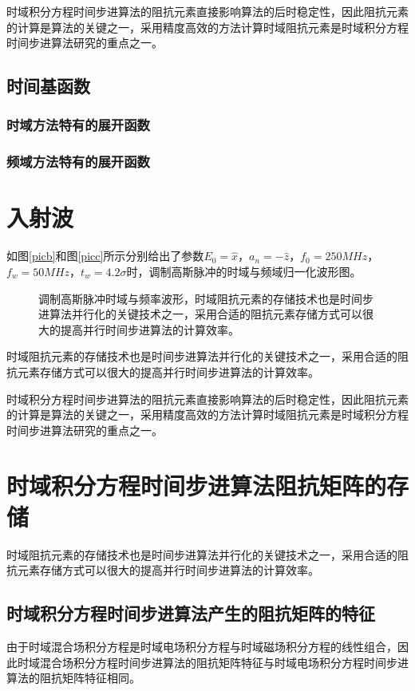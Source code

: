\documentclass{standalone}
\begin{document}
时域积分方程时间步进算法的阻抗元素直接影响算法的后时稳定性，因此阻抗元素的计算是算法的关键之一，采用精度高效的方法计算时域阻抗元素是时域积分方程时间步进算法研究的重点之一。


\subsection{时间基函数}

\subsubsection{时域方法特有的展开函数}

\subsubsection{频域方法特有的展开函数}

\section{入射波}

如图\ref{picb}和图\ref{picc}所示分别给出了参数$E_0=\hat{x}$，$a_n=-\hat{z}$，$f_0=250MHz$，$f_w=50MHz$，$t_w=4.2\sigma$时，调制高斯脉冲的时域与频域归一化波形图。

\begin{figure}[h]
	\caption{调制高斯脉冲时域与频率波形，时域阻抗元素的存储技术也是时间步进算法并行化的关键技术之一，采用合适的阻抗元素存储方式可以很大的提高并行时间步进算法的计算效率。}
	\label{fig1}
\end{figure}
时域阻抗元素的存储技术也是时间步进算法并行化的关键技术之一，采用合适的阻抗元素存储方式可以很大的提高并行时间步进算法的计算效率。

时域积分方程时间步进算法的阻抗元素直接影响算法的后时稳定性，因此阻抗元素的计算是算法的关键之一，采用精度高效的方法计算时域阻抗元素是时域积分方程时间步进算法研究的重点之一。

\section{时域积分方程时间步进算法阻抗矩阵的存储}
时域阻抗元素的存储技术也是时间步进算法并行化的关键技术之一，采用合适的阻抗元素存储方式可以很大的提高并行时间步进算法的计算效率。

\subsection{时域积分方程时间步进算法产生的阻抗矩阵的特征}
由于时域混合场积分方程是时域电场积分方程与时域磁场积分方程的线性组合，因此时域混合场积分方程时间步进算法的阻抗矩阵特征与时域电场积分方程时间步进算法的阻抗矩阵特征相同。
\end{document}

